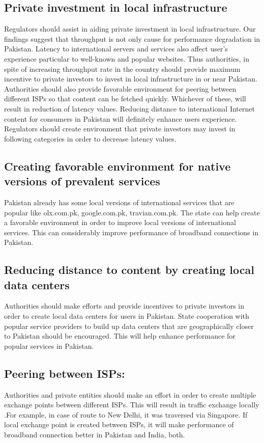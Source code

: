 \documentclass{sig-alternate-10pt}
\begin{document}
\begin{sloppypar}
\subsection {Private investment in local infrastructure}
 \indent Regulators should assist in aiding private investment in local infrastructure. Our findings suggest that throughput is not only cause for performance degradation in Pakistan. Latency to international servers and services also affect user's experience particular to well-known and popular websites. Thus authorities, in spite of increasing throughput rate in the country should provide maximum incentive to private investors to invest in local infrastructure in or near Pakistan. Authorities should also provide favorable environment for peering between different ISPs so that content can be fetched quickly. Whichever of these, will result in reduction of latency values. Reducing distance to international Internet content for consumers in Pakistan will definitely enhance users experience. Regulators should create environment that private investors may invest in following categories in order to decrease latency values.
 \subsection {Creating favorable environment for native versions of prevalent services}
\indent  Pakistan already has some local versions of international services that are popular like olx.com.pk,  google.com.pk, travian.com.pk. The state can help create a favorable environment in order to improve local versions of international services. This can considerably improve performance of broadband connections in Pakistan.
\subsection {Reducing distance to content by creating local data centers}
\indent Authorities should make efforts and provide incentives to private investors in order to create local data centers for users in Pakistan. State cooperation with popular service providers to build up data centers that are geographically closer to Pakistan should be encouraged. This will help enhance performance for popular services in Pakistan.
\subsection {Peering between ISPs:}
 \indent Authorities and private entities should make an effort in order to create multiple exchange points between different ISPs. This will result in traffic exchange locally .For example, in case of route to New Delhi, it was traversed via Singapore. If local exchange point is created between ISPs, it will make performance of broadband connection better in Pakistan and India, both.


\end{sloppypar}
\end{document}
